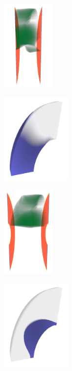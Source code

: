 \documentclass[a4paper,fontsize=12pt,toc=bib,halfparskip]{scrartcl}
\begin{document}
\begin{figure}
	\begin{subfigure}{0.49\textwidth}
		\centering
		\includegraphics[height=4.5cm]{pictures/results/MetalDiskStrain_InvariantSpace1.png}
		\subcaption{}
		\label{MetalDiskStrainInvariant1}
	\end{subfigure}
	\hspace*{\fill}
	\begin{subfigure}{0.49\textwidth}
		\centering
		\includegraphics[height=4.5cm]{pictures/results/MetalDiskStrain_Object1.png}
		\subcaption{}
		\label{MetalDiskStrainObject1}
	\end{subfigure}
	\medskip
	\begin{subfigure}{0.49\textwidth}
		\centering
		\includegraphics[height=4.5cm]{pictures/results/MetalDiskStrain_InvariantSpace2.png}
		\subcaption{}
		\label{MetalDiskStrainInvariant2}
	\end{subfigure}
	\hspace*{\fill}
	\begin{subfigure}{0.49\textwidth}
		\centering
		\includegraphics[height=4.5cm]{pictures/results/MetalDiskStrain_Object2.png}

\end{subfigure}
\end{figure}
\end{document}
